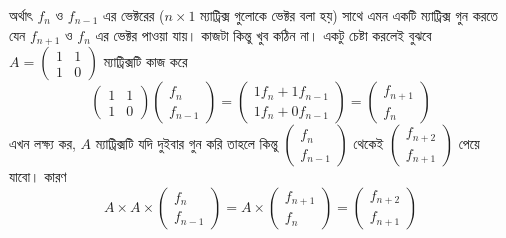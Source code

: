 অর্থাৎ $f_{n}$ ও $f_{n - 1}$ এর ভেক্টরের ($n \times 1$ ম্যাট্রিক্স গুলোকে ভেক্টর বলা হয়) সাথে এমন একটি ম্যাট্রিক্স গুন করতে যেন $f_{n + 1}$ ও $f_{n}$ এর ভেক্টর পাওয়া যায়। কাজটা কিন্তু খুব কঠিন না। একটু চেষ্টা করলেই বুঝবে $A = \begin{pmatrix}
  1 & 1\\
  1 & 0
\end{pmatrix}$  ম্যাট্রিক্সটি কাজ
করে
$$
\begin{pmatrix}
1 & 1 \\
1 & 0
\end{pmatrix}
\begin{pmatrix}
f_{n} \\
f_{n - 1}
\end{pmatrix}
=
\begin{pmatrix}
1f_{n} + 1f_{n - 1} \\
1f_{n} + 0f_{n - 1}
\end{pmatrix}
=
\begin{pmatrix}
f_{n + 1} \\
f_{n}
\end{pmatrix}
$$
এখন লক্ষ্য কর, $A$ ম্যাট্রিক্সটি যদি দুইবার গুন করি তাহলে কিন্তু $\begin{pmatrix}
  f_n\\
  f_{n - 1}
\end{pmatrix}$ থেকেই $\begin{pmatrix}
  f_{n + 2}\\
  f_{n + 1}
\end{pmatrix}$ পেয়ে যাবো।  কারণ
$$
A \times A \times
\begin{pmatrix}
f_{n} \\
f_{n - 1}
\end{pmatrix}
=
A \times
\begin{pmatrix}
f_{n + 1} \\
f_{n}
\end{pmatrix}
=
\begin{pmatrix}
f_{n + 2} \\
f_{n + 1}
\end{pmatrix}
$$

